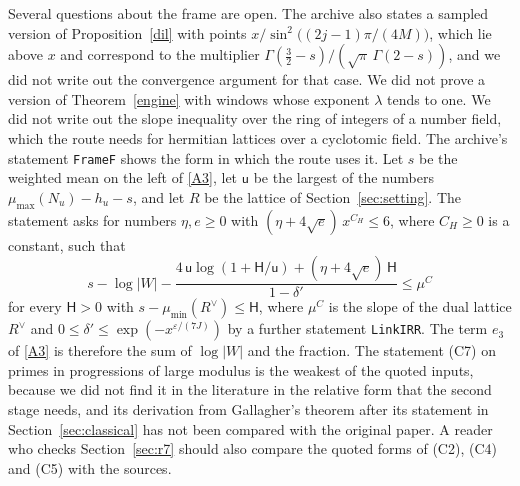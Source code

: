 \documentclass[11pt,letterpaper]{article}
\numberwithin{equation}{section}
\begin{document}
Several questions about the frame are open. The archive also states a sampled version of Proposition~\ref{dil} with points $x/\sin^2\!\big((2j-1)\pi/(4M)\big)$, which lie above $x$ and correspond to the multiplier $\Gamma(\tfrac32-s)/(\sqrt\pi\,\Gamma(2-s))$, and we did not write out the convergence argument for that case. We did not prove a version of Theorem~\ref{engine} with windows whose exponent $\lambda$ tends to one. We did not write out the slope inequality over the ring of integers of a number field, which the route needs for hermitian lattices over a cyclotomic field. The archive's statement \texttt{FrameF} shows the form in which the route uses it. Let $s$ be the weighted mean on the left of \eqref{A3}, let $\mathsf u$ be the largest of the numbers $\mu_{\max}(N_u)-h_u-s$, and let $R$ be the lattice of Section~\ref{sec:setting}. The statement asks for numbers $\eta,e\ge0$ with $(\eta+4\sqrt e)\,x^{C_H}\le6$, where $C_H\ge0$ is a constant, such that
\[
s-\log|W|-\frac{4\,\mathsf u\log(1+\mathsf H/\mathsf u)+(\eta+4\sqrt e)\,\mathsf H}{1-\delta'}\le\mu^C
\]
for every $\mathsf H>0$ with $s-\mu_{\min}(R^\vee)\le\mathsf H$, where $\mu^C$ is the slope of the dual lattice $R^\vee$ and $0\le\delta'\le\exp(-x^{\varepsilon/(7J)})$ by a further statement \texttt{LinkIRR}. The term $e_3$ of \eqref{A3} is therefore the sum of $\log|W|$ and the fraction. The statement (C7) on primes in progressions of large modulus is the weakest of the quoted inputs, because we did not find it in the literature in the relative form that the second stage needs, and its derivation from Gallagher's theorem after its statement in Section~\ref{sec:classical} has not been compared with the original paper. A reader who checks Section~\ref{sec:r7} should also compare the quoted forms of (C2), (C4) and (C5) with the sources.
\end{document}
